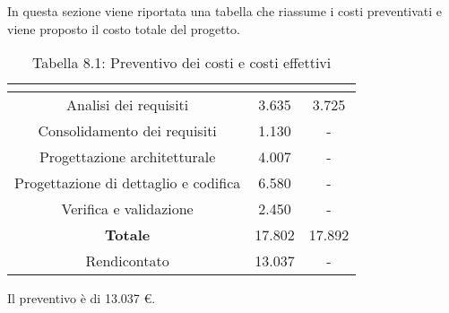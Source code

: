 In questa sezione viene riportata una tabella che riassume i costi preventivati e viene proposto il costo totale del progetto.
\\
\renewcommand{\arraystretch}{1.5}
\begin{table}[H]
\begin{center}
\begin{tabular}{|c|c|c|}
\hline
\rowcolor{title_row}
\textbf{\color{title_text}{Periodo}}  & \textbf{\color{title_text}{Preventivo \euro}} & \textbf{\color{title_text}{Consuntivo \euro}} \\ \hline
Analisi dei requisiti   & 3.635 & 3.725 \\ \hline
Consolidamento dei requisiti   & 1.130 & - \\ \hline
Progettazione architetturale    & 4.007 & - \\ \hline
Progettazione di dettaglio e codifica    & 6.580 & - \\ \hline
Verifica e validazione    & 2.450 & - \\ \hline
\textbf{Totale}   & 17.802 & 17.892 \\ \hline
Rendicontato   & 13.037 & - \\ \hline
\end{tabular}
\caption{Tabella 8.1: Preventivo dei costi e costi effettivi\label{}}
\end{center}
\end{table}
\renewcommand{\arraystretch}{1}

Il preventivo è di 13.037 \euro{}. 
\newpage
